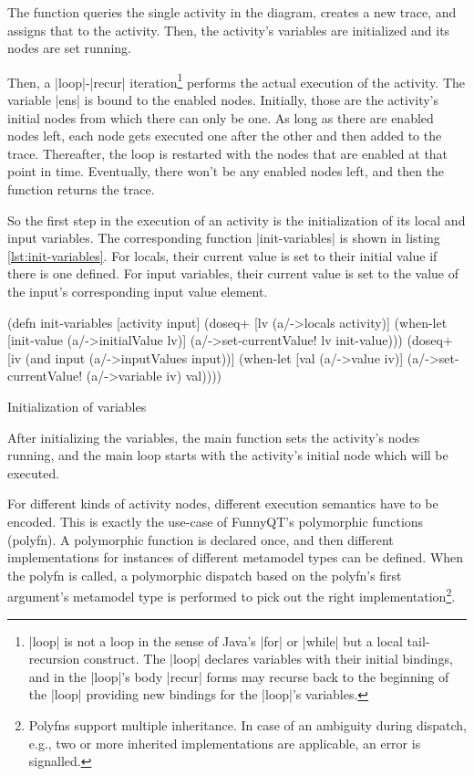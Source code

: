 \documentclass[submission]{eptcs}
\newcommand{\code}{\clojureinline}
\begin{document}
The function queries the single activity in the diagram, creates a new trace,
and assigns that to the activity.  Then, the activity's variables are
initialized and its nodes are set running.

Then, a \code|loop|-\code|recur| iteration\footnote{\code|loop| is not a loop
  in the sense of Java's \code|for| or \code|while| but a local tail-recursion
  construct.  The \code|loop| declares variables with their initial bindings,
  and in the \code|loop|'s body \code|recur| forms may recurse back to the
  beginning of the \code|loop| providing new bindings for the \code|loop|'s
  variables.} performs the actual execution of the activity.  The variable
\code|ens| is bound to the enabled nodes.  Initially, those are the activity's
initial nodes from which there can only be one.  As long as there are enabled
nodes left, each node gets executed one after the other and then added to the
trace.  Thereafter, the loop is restarted with the nodes that are enabled at
that point in time.  Eventually, there won't be any enabled nodes left, and
then the function returns the trace.

So the first step in the execution of an activity is the initialization of its
local and input variables.  The corresponding function \code|init-variables| is
shown in listing \vref{lst:init-variables}.  For locals, their current value is
set to their initial value if there is one defined.  For input variables, their
current value is set to the value of the input's corresponding input value
element.

\begin{listing}[h!tb]
\begin{clojurecode}
(defn init-variables [activity input]
  (doseq+ [lv (a/->locals activity)]
    (when-let [init-value (a/->initialValue lv)]
      (a/->set-currentValue! lv init-value)))
  (doseq+ [iv (and input (a/->inputValues input))]
    (when-let [val (a/->value iv)]
      (a/->set-currentValue! (a/->variable iv) val))))
\end{clojurecode}
\caption{Initialization of variables}
\label{lst:init-variables}
\end{listing}

After initializing the variables, the main function sets the activity's nodes
running, and the main loop starts with the activity's initial node which will
be executed.

For different kinds of activity nodes, different execution semantics have to be
encoded.  This is exactly the use-case of FunnyQT's polymorphic functions
(polyfn).  A polymorphic function is declared once, and then different
implementations for instances of different metamodel types can be defined.
When the polyfn is called, a polymorphic dispatch based on the polyfn's first
argument's metamodel type is performed to pick out the right
implementation\footnote{Polyfns support multiple inheritance.  In case of an
  ambiguity during dispatch, e.g., two or more inherited implementations are
  applicable, an error is signalled.}.
\end{document}

